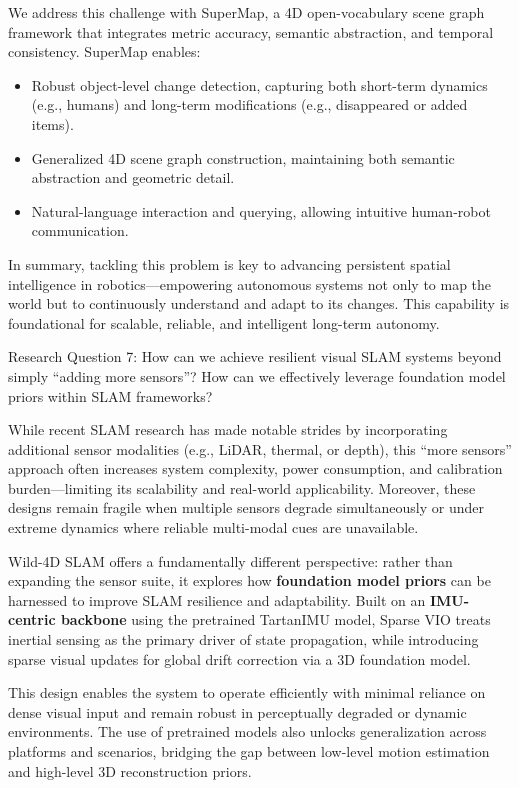 We address this challenge with SuperMap, a 4D open-vocabulary scene graph framework that integrates metric accuracy, semantic abstraction, and temporal consistency. SuperMap enables:

\begin{itemize}
    \item Robust object-level change detection, capturing both short-term dynamics (e.g., humans) and long-term modifications (e.g., disappeared or added items).
    \item  Generalized 4D scene graph construction, maintaining both semantic abstraction and geometric detail.
    \item  Natural-language interaction and querying, allowing intuitive human-robot communication.
\end{itemize}

In summary, tackling this problem is key to advancing persistent spatial intelligence in robotics—empowering autonomous systems not only to map the world but to continuously understand and adapt to its changes. This capability is foundational for scalable, reliable, and intelligent long-term autonomy.


\begin{framed} Research Question 7: How can we achieve resilient visual SLAM systems beyond simply “adding more sensors”? How can we effectively leverage foundation model priors within SLAM frameworks? \end{framed}

While recent SLAM research has made notable strides by incorporating additional sensor modalities (e.g., LiDAR, thermal, or depth), this “more sensors” approach often increases system complexity, power consumption, and calibration burden—limiting its scalability and real-world applicability. Moreover, these designs remain fragile when multiple sensors degrade simultaneously or under extreme dynamics where reliable multi-modal cues are unavailable.

Wild-4D SLAM offers a fundamentally different perspective: rather than expanding the sensor suite, it explores how \textbf{foundation model priors} can be harnessed to improve SLAM resilience and adaptability. Built on an \textbf{IMU-centric backbone} using the pretrained TartanIMU model, Sparse VIO treats inertial sensing as the primary driver of state propagation, while introducing sparse visual updates for global drift correction via a 3D foundation model.

This design enables the system to operate efficiently with minimal reliance on dense visual input and remain robust in perceptually degraded or dynamic environments. The use of pretrained models also unlocks generalization across platforms and scenarios, bridging the gap between low-level motion estimation and high-level 3D reconstruction priors.

